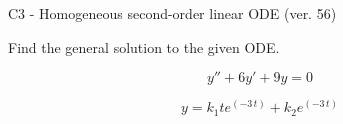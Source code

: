\begin{exercise}
  \begin{exerciseTitle}C3 - Homogeneous second-order linear ODE (ver. 56)\end{exerciseTitle}
  \begin{exerciseStatement}
    
Find the general solution to the given ODE.

    
\[y''+6y'+9y = 0\]

  \end{exerciseStatement}
  \begin{exerciseAnswer}
    
\[y= k_{1} t e^{\left(-3 \, t\right)} + k_{2} e^{\left(-3 \, t\right)}\]

  \end{exerciseAnswer}
\end{exercise}
